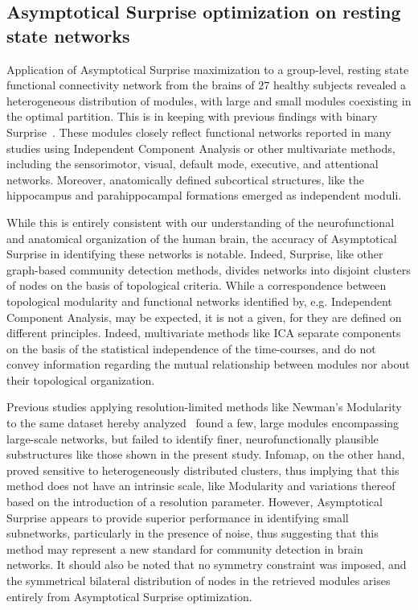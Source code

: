 \subsection{Asymptotical Surprise optimization on resting state networks}
Application of Asymptotical Surprise maximization to a group-level, resting state functional connectivity network from the brains of $27$ healthy subjects revealed a heterogeneous distribution of modules, with large and small modules coexisting in the optimal partition.
This is in keeping with previous findings with binary Surprise~\cite{nicolini2016}.
These modules closely reflect functional networks reported in many studies using Independent Component Analysis or other multivariate methods, including the sensorimotor, visual, default mode, executive, and attentional networks.
Moreover, anatomically defined subcortical structures, like the hippocampus and parahippocampal formations emerged as independent moduli.

While this is entirely consistent with our understanding of the neurofunctional and anatomical organization of the human brain, the accuracy of Asymptotical Surprise in identifying these networks is notable.
Indeed, Surprise, like other graph-based community detection methods, divides networks into disjoint clusters of nodes on the basis of topological criteria.
While a correspondence between topological modularity and functional networks identified by, e.g. Independent Component Analysis, may be expected, it is not a given, for they are defined on different principles. Indeed, multivariate methods like ICA separate components on the basis of the statistical independence of the time-courses, and do not convey information regarding the mutual relationship between modules nor about their topological organization.

Previous studies applying resolution-limited methods like Newman's Modularity to the same dataset hereby analyzed~\cite{crossley2013a} found a few, large modules encompassing large-scale networks, but failed to identify finer, neurofunctionally plausible substructures like those shown in the present study. Infomap, on the other hand, proved sensitive to heterogeneously distributed clusters, thus implying that this method does not have an intrinsic scale, like Modularity and variations thereof based on the introduction of a resolution parameter. 
However, Asymptotical Surprise appears to provide superior performance in identifying small subnetworks, particularly in the presence of noise, thus suggesting that this method may represent a new standard for community detection in brain networks. It should also be noted that no symmetry constraint was imposed, and the symmetrical bilateral distribution of nodes in the retrieved modules arises entirely from Asymptotical Surprise optimization. 

